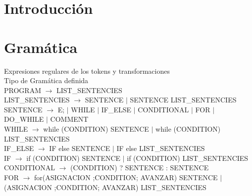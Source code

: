\documentclass[10pt,a4paper]{article}
\begin{document}

\fecha{\today}



\maketitle

\tableofcontents

\newpage
\section{Introducción}

\section{Gramática}
Expresiones regulares de los tokens y transformaciones\\
Tipo de Gramática definida \\


PROGRAM $\rightarrow$ LIST\_SENTENCIES \\

LIST\_SENTENCIES $\rightarrow$ SENTENCE $|$ SENTENCE LIST\_SENTENCIES\\

SENTENCE $\rightarrow$ E; $|$ WHILE $|$ IF\_ELSE $|$ CONDITIONAL $|$ FOR $|$ DO\_WHILE $|$ COMMENT \\

WHILE $\rightarrow$ while (CONDITION) SENTENCE $|$ while (CONDITION) {LIST\_SENTENCIES} \\

IF\_ELSE $\rightarrow$ IF else SENTENCE $|$ IF else {LIST\_SENTENCIES} \\

IF $\rightarrow$ if (CONDITION) SENTENCE $|$ if (CONDITION) {LIST\_SENTENCIES} \\

CONDITIONAL $\rightarrow$ (CONDITION) ? SENTENCE : SENTENCE \\

FOR $\rightarrow$ for(ASIGNACION ;CONDITION; AVANZAR) SENTENCE $|$ (ASIGNACION ;CONDITION; AVANZAR) {LIST\_SENTENCIES} \\
\end{document}

